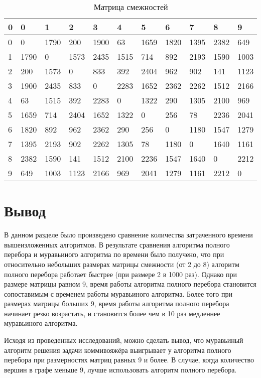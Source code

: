 \begin{table}[ht]
	\centering
	\caption{Матрица смежностей}
	\label{table:matrix}
	\begin{tabular}{ | l | l | l | l | l | l | l | l | l | l | l |}
		\hline
		0 & 0    & 1    & 2    & 3    & 4    & 5    & 6    & 7    & 8    & 9    \\ \hline
		0 & 0    & 1790 & 200  & 1900 & 63   & 1659 & 1820 & 1395 & 2382 & 649  \\ \hline
		1 & 1790 & 0    & 1573 & 2435 & 1515 & 714  & 892  & 2193 & 1590 & 1003 \\ \hline
		2 & 200  & 1573 & 0    & 833  & 392  & 2404 & 962  & 902  & 141  & 1123 \\ \hline
		3 & 1900 & 2435 & 833  & 0    & 2283 & 1652 & 2362 & 2262 & 1512 & 2166 \\ \hline
		4 & 63   & 1515 & 392  & 2283 & 0    & 1322 & 290  & 1305 & 2100 & 969  \\ \hline
		5 & 1659 & 714  & 2404 & 1652 & 1322 & 0    & 256  & 78   & 2236 & 2041 \\ \hline
		6 & 1820 & 892  & 962  & 2362 & 290  & 256  & 0    & 1180 & 1547 & 1279 \\ \hline
		7 & 1395 & 2193 & 902  & 2262 & 1305 & 78   & 1180 & 0    & 1640 & 1161 \\ \hline
		8 & 2382 & 1590 & 141  & 1512 & 2100 & 2236 & 1547 & 1640 & 0    & 2212 \\ \hline
		9 & 649  & 1003 & 1123 & 2166 & 969  & 2041 & 1279 & 1161 & 2212 & 0    \\ \hline
	\end{tabular}
\end{table}

\clearpage

\clearpage

\clearpage

\clearpage





\section*{Вывод}

В данном разделе было произведено сравнение количества затраченного времени вышеизложенных алгоритмов. В результате сравнения алгоритма полного перебора и муравьиного алгоритма по времени было получено, что при относительно небольших размерах матрицы смежности (от 2 до 8) алгоритм полного перебора работает быстрее (при размере 2 в 1000 раз). Однако при размере матрицы равном 9, время работы алгоритма полного перебора становится сопоставимым с временем работы муравьиного алгоритма. Более того при размерах матрицы больших 9, время работы алгоритма полного перебора начинает резко возрастать, и становится более чем в 10 раз медленнее  муравьиного алгоритма.

Исходя из проведенных исследований, можно сделать вывод, что муравьиный алгоритм решения задачи коммивояжёра выигрывает у алгоритма полного перебора при размерностях матриц равных 9 и более. В случае, когда количество вершин в графе меньше 9, лучше использовать алгоритм полного перебора.

